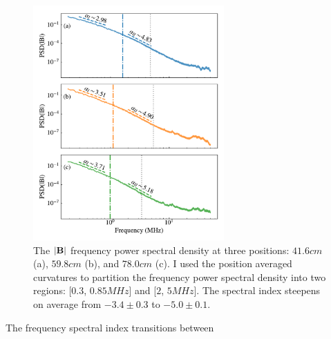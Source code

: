 \documentclass[%
 aip,
 amsmath,amssymb,
preprint,%
]{revtex4-1}
\begin{document}
\begin{figure}
\includegraphics[width=0.65\textwidth]{Figures/psd/pwr_den_f_all_window_lmfitv2.pdf}%
\caption{\label{fig:freq_psd} The $|\vb{B}|$ frequency power spectral density at three positions: $41.6cm$ (a), $59.8cm$ (b), and $78.0cm$ (c). I used the position averaged curvatures to partition the frequency power spectral density into two regions: [$0.3$, $0.85MHz$] and [$2$, $5MHz$]. The spectral index steepens on average from $-3.4\pm 0.3$ to $-5.0\pm0.1$.}
\end{figure}
The frequency spectral index transitions between 









\end{document}
